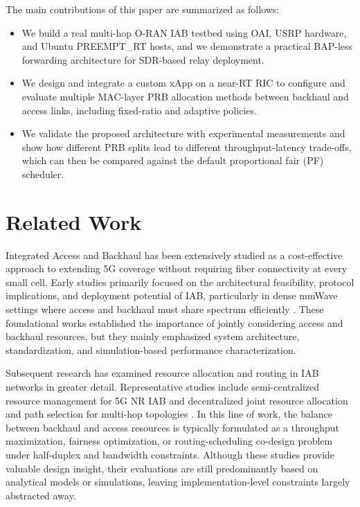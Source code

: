 \documentclass[conference, a4paper]{IEEEtran}
\begin{document}
The main contributions of this paper are summarized as follows:
\begin{itemize}
    \item We build a real multi-hop O-RAN IAB testbed using OAI, USRP hardware, and Ubuntu PREEMPT\_RT hosts, and we demonstrate a practical BAP-less forwarding architecture for SDR-based relay deployment.
    \item We design and integrate a custom xApp on a near-RT RIC to configure and evaluate multiple MAC-layer PRB allocation methods between backhaul and access links, including fixed-ratio and adaptive policies.
    \item We validate the proposed architecture with experimental measurements and show how different PRB splits lead to different throughput-latency trade-offs, which can then be compared against the default proportional fair (PF) scheduler.
\end{itemize}

\section{Related Work}
Integrated Access and Backhaul has been extensively studied as a cost-effective approach to extending 5G coverage without requiring fiber connectivity at every small cell. Early studies primarily focused on the architectural feasibility, protocol implications, and deployment potential of IAB, particularly in dense mmWave settings where access and backhaul must share spectrum efficiently \cite{polese2020iab,ronkainen2021iab}. These foundational works established the importance of jointly considering access and backhaul resources, but they mainly emphasized system architecture, standardization, and simulation-based performance characterization.

Subsequent research has examined resource allocation and routing in IAB networks in greater detail. Representative studies include semi-centralized resource management for 5G NR IAB and decentralized joint resource allocation and path selection for multi-hop topologies \cite{pagin2022semicentralized,alghafari2022decentralized}. In this line of work, the balance between backhaul and access resources is typically formulated as a throughput maximization, fairness optimization, or routing-scheduling co-design problem under half-duplex and bandwidth constraints. Although these studies provide valuable design insight, their evaluations are still predominantly based on analytical models or simulations, leaving implementation-level constraints largely abstracted away.
\end{document}
